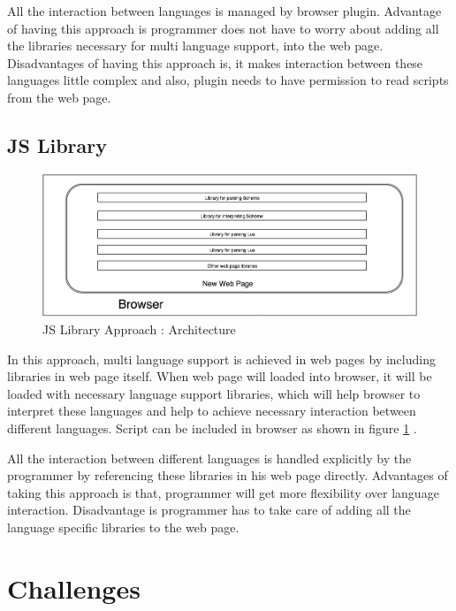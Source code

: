   All the interaction between languages is managed by browser plugin. Advantage of having this approach is programmer does not have to worry about adding all the libraries necessary for multi language support, into the web page. Disadvantages of having this approach is, it makes interaction between these languages little complex and also, plugin needs to have permission to read scripts from the web page.
  
	
\subsection{JS Library}

\begin{figure}[ht]
	\begin{center}
		\includegraphics[width=\linewidth]{./images/JSLibraryApproach.png}
	\end{center}
	\caption{JS Library Approach : Architecture}
	\label{fig:jslibraryarchitecture}
\end{figure}

   In this approach, multi language support is achieved in web pages by including libraries in web page itself. When web page will loaded into browser, it will be loaded with necessary language support libraries, which will help browser to interpret these languages and help to achieve necessary interaction between different languages. Script can be included in browser as shown in figure \ref{fig:jslibraryarchitecture} .
   
   All the interaction between different languages is handled explicitly by the programmer by referencing these libraries in his web page directly. Advantages of taking this approach is that, programmer will get more flexibility over language interaction. Disadvantage is programmer has to take care of adding all the language specific libraries to the web page.  

\section{Challenges}

